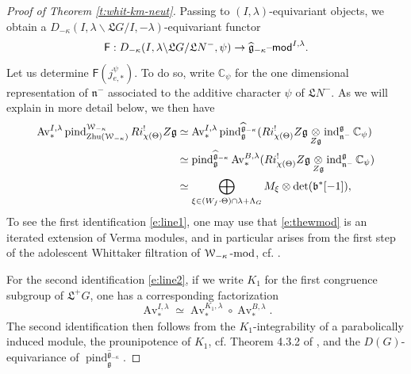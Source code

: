 \documentclass[11pt,reqno]{amsart}
\newcommand{\fL}{\mathfrak{L}}
\newcommand{\fg}{\mathfrak{g}}
\newcommand{\fb}{\mathfrak{b}}
\newcommand{\fn}{\mathfrak{n}}
\newcommand{\on}{\operatorname}
\theoremstyle{remark}
\numberwithin{equation}{section}
\newcommand{\gmk}{\widehat{\fg}_{-\kappa}}
\newcommand{\sW}{\EuScript{W}}
\renewcommand{\mod}{\text{\textendash}\mathsf{mod}}
\begin{document}
\begin{proof}[Proof of Theorem \ref{t:whit-km-neut}]
Passing to $(I, \lambda)$-equivariant objects, we obtain a $D_{-\kappa}(I, 
\lambda \backslash \fL G / I, -\lambda)$-equivariant functor
%
\[
\mathsf{F}: D_{-\kappa}( I, \lambda \backslash \fL G / \fL N^-, \psi) 
\rightarrow \gmk\mod^{I, \lambda}.
\]
%
Let us determine $\mathsf{F}(j_{e, *}^\psi)$. To do so, write $\mathbb{C}_\psi$ 
for the one dimensional representation of $\fn^-$ associated to the additive 
character $\psi$ of $\fL N^-$. As we will explain in more detail below, we then 
have
%
\begin{align}\label{e:line1}
 \on{Av}^{I, \lambda}_{*} \on{pind}_{\on{Zhu}(\sW_{-\kappa})}^{\sW_{-\kappa}} 
 Ri_{\chi(\Theta)}^! Z \fg  &\simeq \on{Av}^{I, \lambda}_{*} 
 \on{pind}_{\fg}^{\gmk} (Ri^!_{\chi(\Theta)} Z\fg \underset{Z \fg}{\otimes} 
 \on{ind}_{\fn^-}^{\fg} \mathbb{C}_\psi)\\ & \label{e:line2}\simeq 
 \on{pind}_{\fg}^{\gmk} \on{Av}^{B, \lambda}_{*} (Ri^!_{\chi(\Theta)} Z \fg 
 \underset{Z \fg}{\otimes} \on{ind}_{\fn^-}^{\fg} \mathbb{C}_\psi)
 \\ & \label{e:line3}\simeq \bigoplus_{ \xi \in (W_f \cdot \Theta) \cap \lambda 
 + \Lambda_G} 
 M_\xi \otimes \det( \fb^*[-1]),
\end{align}
%
To see the first identification \eqref{e:line1}, one may use that 
\eqref{e:thewmod} is an 
iterated extension of Verma modules, and in particular arises from the first 
step of the adolescent Whittaker filtration of $\sW_{-\kappa}\on{-mod}$, cf. 
\cite{whit}.

 For the second identification \eqref{e:line2}, if we write $K_1$ 
for the first 
congruence subgroup of $\fL^+ G$, one has a corresponding factorization
%
\[
\on{Av}_{*}^{I, \lambda} \simeq \on{Av}_{*}^{K_1, \lambda} \circ 
\on{Av}_{*}^{B, \lambda}.
\] 
%
The second identification then follows from the $K_1$-integrability of a 
parabolically induced module, the prounipotence of $K_1$, cf. Theorem 4.3.2 
of \cite{beraldo}, and the 
$D(G)$-equivariance of 
$\on{pind}_{\fg}^{\gmk}$. 


\end{proof}
\end{document}
